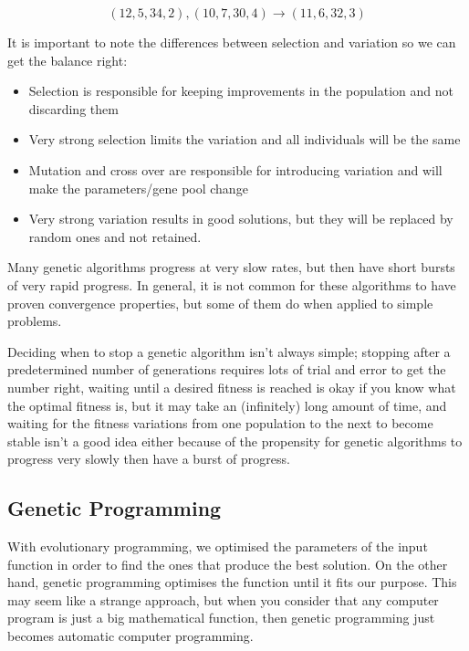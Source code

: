 \[
  (12 , 5 , 34 , 2), (10 , 7 , 30 , 4) \rightarrow (11 , 6 , 32 , 3)
\]

It is important to note the differences between selection and variation so we
can get the balance right:

\begin{itemize}
  \item Selection is responsible for keeping improvements in the population and
  not discarding them
  \item Very strong selection limits the variation and all individuals will be 
  the same
  \item Mutation and cross over are responsible for introducing variation and 
  will make the parameters/gene pool change
  \item Very strong variation results in good solutions, but they will be 
  replaced by random ones and not retained.
\end{itemize}

Many genetic algorithms progress at very slow rates, but then have short bursts
of very rapid progress. In general, it is not common for these algorithms to
have proven convergence properties, but some of them do when applied to simple
problems.

Deciding when to stop a genetic algorithm isn't always simple; stopping after a
predetermined number of generations requires lots of trial and error to get the
number right, waiting until a desired fitness is reached is okay if you know
what the optimal fitness is, but it may take an (infinitely) long amount of
time, and waiting for the fitness variations from one population to the next to
become stable isn't a good idea either because of the propensity for genetic
algorithms to progress very slowly then have a burst of progress.


\subsection{Genetic Programming}

With evolutionary programming, we optimised the parameters of the
input function in order to find the ones that produce the best
solution. On the other hand, genetic programming optimises the
function until it fits our purpose. This may seem like a strange
approach, but when you consider that any computer program is just a
big mathematical function, then genetic programming just becomes
automatic computer programming.

